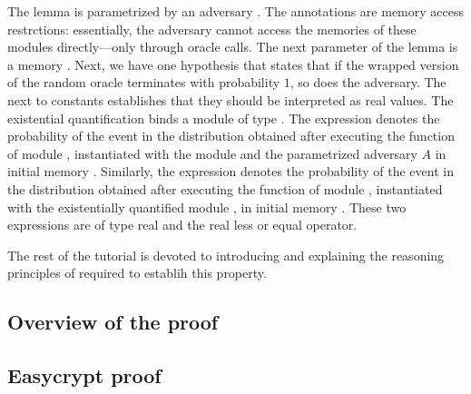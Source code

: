 The lemma  is parametrized by an adversary . The
annotations  are
memory access restrctions: essentially, the adversary cannot access
the memories of these modules directly---only through oracle
calls. The next parameter of the lemma is a memory . Next, we
have one hypothesis that states that if the wrapped version of the
random oracle terminates with probability $1$, so does the
adversary. The  next to constants establishes that they should
be interpreted as real values. The existential quantification binds a
module  of type . The expression
 denotes the probability of the
event  in the distribution obtained after executing the
 function of module , instantiated with the module
 and the parametrized adversary $A$ in initial memory
. Similarly, the expression  denotes the probability of the event  in the
distribution obtained after executing the  function of module
, instantiated with the existentially quantified module ,
in initial memory . These two expressions are of type real and
the \ec{<=} real less or equal operator.

The rest of the tutorial is devoted to introducing and explaining the
reasoning principles of \EC required to establih this property.

\subsection{Overview of the proof}

\subsection{Easycrypt proof}


